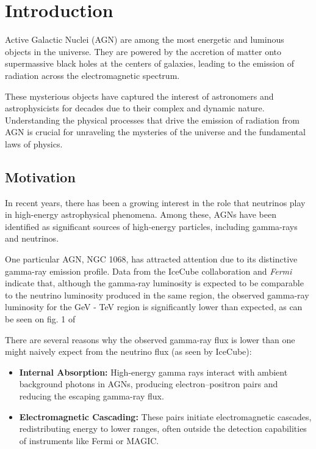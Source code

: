 \chapter{Introduction}
\label{chap:Introduction}

Active Galactic Nuclei (AGN) are among the most energetic and luminous objects in the universe. They are powered by the accretion of matter onto supermassive black holes at the centers of galaxies, leading to the emission of radiation across the electromagnetic spectrum. 

These mysterious objects have captured the interest of astronomers and astrophysicists for decades due to their complex and dynamic nature. Understanding the physical processes that drive the emission of radiation from AGN is crucial for unraveling the mysteries of the universe and the fundamental laws of physics.

\section{Motivation}

In recent years, there has been a growing interest in the role that neutrinos play in high-energy astrophysical phenomena. Among these, AGNs have been identified as significant sources of high-energy particles, including gamma-rays and neutrinos. 

One particular AGN, NGC 1068, has attracted attention due to its distinctive gamma-ray emission profile. Data from the IceCube collaboration \citep{IceCube2022} and \textit{Fermi} indicate that, although the gamma-ray luminosity is expected to be comparable to the neutrino luminosity produced in the same region, the observed gamma-ray luminosity for the GeV - TeV region is significantly lower than expected, as can be seen on fig. 1 of \citet{padovani2024highenergyneutrinosvicinitysupermassive}

There are several reasons why the observed gamma-ray flux is lower than one might naively expect from the neutrino flux (as seen by IceCube):

\begin{itemize}
    \item \textbf{Internal Absorption:} High-energy gamma rays interact with ambient background photons in AGNs, producing electron–positron pairs and reducing the escaping gamma-ray flux.
    \item \textbf{Electromagnetic Cascading:} These pairs initiate electromagnetic cascades, redistributing energy to lower ranges, often outside the detection capabilities of instruments like Fermi or MAGIC.
\end{itemize}

